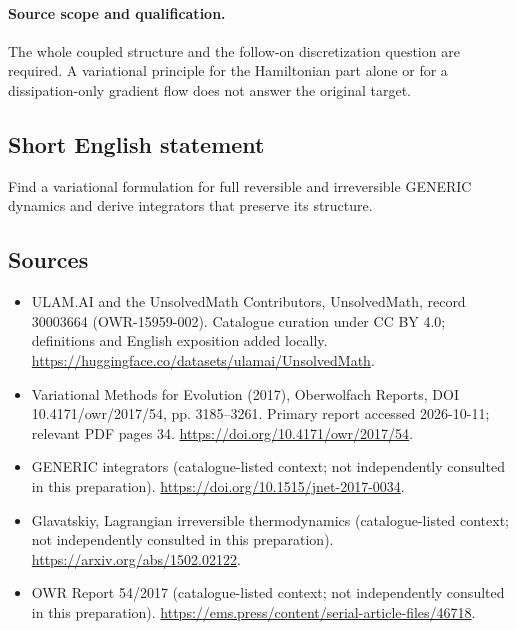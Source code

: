\documentclass[11pt]{article}
\begin{document}
\paragraph{Source scope and qualification.}
The whole coupled structure and the follow-on discretization question are required. A variational principle for the Hamiltonian part alone or for a dissipation-only gradient flow does not answer the original target.
\subsection{Short English statement}
Find a variational formulation for full reversible and irreversible GENERIC dynamics and derive integrators that preserve its structure.
\subsection{Sources}
\begin{itemize}
\item[\hypertarget{source:30003664:1}{S1}] ULAM.AI and the UnsolvedMath Contributors, UnsolvedMath, record 30003664 (OWR-15959-002). Catalogue curation under CC BY 4.0; definitions and English exposition added locally.
\url{https://huggingface.co/datasets/ulamai/UnsolvedMath}.
\item[\hypertarget{source:30003664:2}{S2}] Variational Methods for Evolution (2017), Oberwolfach Reports, DOI 10.4171/owr/2017/54, pp. 3185--3261. Primary report accessed 2026-10-11; relevant PDF pages 34.
\url{https://doi.org/10.4171/owr/2017/54}.
\item[\hypertarget{source:30003664:3}{S3}] GENERIC integrators (catalogue-listed context; not independently consulted in this preparation).
\url{https://doi.org/10.1515/jnet-2017-0034}.
\item[\hypertarget{source:30003664:4}{S4}] Glavatskiy, Lagrangian irreversible thermodynamics (catalogue-listed context; not independently consulted in this preparation).
\url{https://arxiv.org/abs/1502.02122}.
\item[\hypertarget{source:30003664:5}{S5}] OWR Report 54/2017 (catalogue-listed context; not independently consulted in this preparation).
\url{https://ems.press/content/serial-article-files/46718}.
\end{itemize}
\label{end:30003664}
\end{document}

